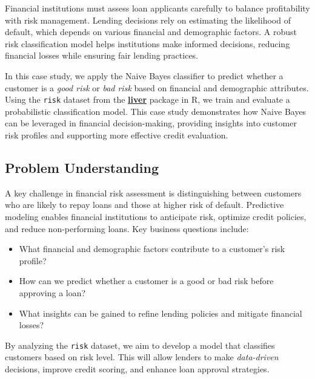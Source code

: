 \documentclass[
]{book}
\newcommand{\passthrough}[1]{#1}
\providecommand{\tightlist}{%
  \setlength{\itemsep}{0pt}\setlength{\parskip}{0pt}}
\theoremstyle{definition}
\theoremstyle{definition}
\theoremstyle{definition}
\theoremstyle{definition}
\theoremstyle{remark}
\begin{document}
Financial institutions must assess loan applicants carefully to balance profitability with risk management. Lending decisions rely on estimating the likelihood of default, which depends on various financial and demographic factors. A robust risk classification model helps institutions make informed decisions, reducing financial losses while ensuring fair lending practices.

In this case study, we apply the Naive Bayes classifier to predict whether a customer is a \emph{good risk} or \emph{bad risk} based on financial and demographic attributes. Using the \passthrough{\lstinline!risk!} dataset from the \href{https://CRAN.R-project.org/package=liver}{\textbf{liver}} package in R, we train and evaluate a probabilistic classification model. This case study demonstrates how Naive Bayes can be leveraged in financial decision-making, providing insights into customer risk profiles and supporting more effective credit evaluation.

\subsection*{Problem Understanding}\label{problem-understanding-2}

A key challenge in financial risk assessment is distinguishing between customers who are likely to repay loans and those at higher risk of default. Predictive modeling enables financial institutions to anticipate risk, optimize credit policies, and reduce non-performing loans. Key business questions include:

\begin{itemize}
\tightlist
\item
  What financial and demographic factors contribute to a customer's risk profile?\\
\item
  How can we predict whether a customer is a good or bad risk before approving a loan?\\
\item
  What insights can be gained to refine lending policies and mitigate financial losses?
\end{itemize}

By analyzing the \passthrough{\lstinline!risk!} dataset, we aim to develop a model that classifies customers based on risk level. This will allow lenders to make \emph{data-driven} decisions, improve credit scoring, and enhance loan approval strategies.
\end{document}
